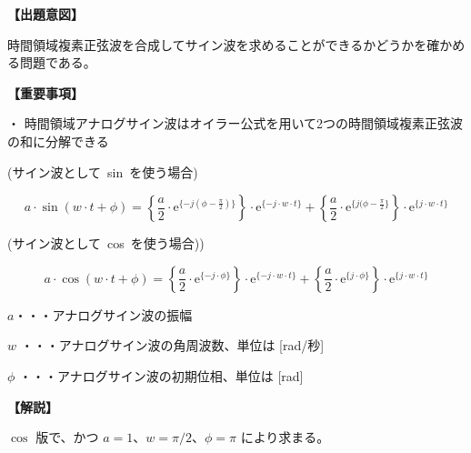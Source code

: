 \noindent \textbf{【出題意図】}

\bigskip
\noindent 時間領域複素正弦波を合成してサイン波を求めることができるかどうかを確かめる問題である。

\vspace{1em}
\noindent \textbf{【重要事項】}

\medskip
\noindent ・ 時間領域アナログサイン波はオイラー公式を用いて2つの時間領域複素正弦波の和に分解できる

\medskip
\noindent \mbox{(サイン波として sin を使う場合)}

\[
a \cdot \sin ( w \cdot t + \phi )
=  \left \{ \frac{a}{2} \cdot \textrm{e}^{\{-j (\phi-\frac{\pi}{2}) \}} \right \} \cdot \textrm{e}^{\{-j \cdot w \cdot t \}}
+  \left \{ \frac{a}{2} \cdot \textrm{e}^{\{j (\phi-\frac{\pi}{2} \}} \right \} \cdot \textrm{e}^{\{j \cdot w \cdot t \}}
\]

\medskip
\noindent \mbox{(サイン波として cos を使う場合))}

\[
a \cdot \cos ( w \cdot t + \phi )
=  \left \{ \frac{a}{2} \cdot \textrm{e}^{\{-j \cdot \phi \}} \right \} \cdot \textrm{e}^{\{-j \cdot w \cdot t \}}
+  \left \{ \frac{a}{2} \cdot \textrm{e}^{\{j  \cdot \phi \}} \right \} \cdot \textrm{e}^{\{j \cdot w \cdot t \}}
\]

\bigskip
\noindent  $a$・・・アナログサイン波の振幅

\bigskip
\noindent $w$ ・・・アナログサイン波の角周波数、単位は [rad/秒]

\bigskip
\noindent $\phi$ ・・・アナログサイン波の初期位相、単位は [rad]

\bigskip

\vspace{1em}
\noindent \textbf{【解説】}

\bigskip
\noindent $\cos$ 版で、かつ $a = 1$、$w = \pi/2$、$\phi = \pi$ により求まる。
